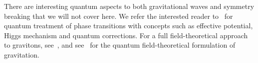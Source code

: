 

    There are interesting quantum aspects to both gravitational waves and symmetry breaking that we will not cover here. We refer the interested reader to~\citet[~11,~12,~20~\&~22]{peskinIntroductionQuantumField1995} for quantum treatment of phase transitions with concepts such as effective potential, Higgs mechanism and quantum corrections. For a full field-theoretical approach to gravitons, see~\citet[~2]{maggioreGravitationalWavesVol2007}, and see~\citet{feynmanFeynmanLecturesGravitation1995} for the quantum field-theoretical formulation of gravitation. %
